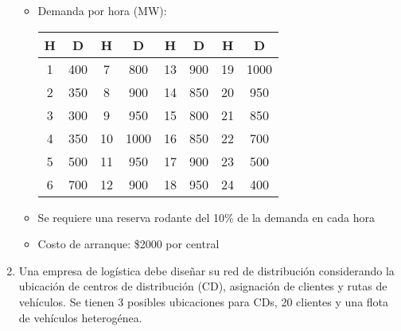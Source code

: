\documentclass[12pt]{article}
\begin{document}
\begin{enumerate}
\begin{itemize}
\item Demanda por hora (MW):

\begin{center}
\begin{tabular}{cccccccc}
\toprule
H & D & H & D & H & D & H & D \\
\midrule
1 & 400 & 7 & 800 & 13 & 900 & 19 & 1000 \\
2 & 350 & 8 & 900 & 14 & 850 & 20 & 950 \\
3 & 300 & 9 & 950 & 15 & 800 & 21 & 850 \\
4 & 350 & 10 & 1000 & 16 & 850 & 22 & 700 \\
5 & 500 & 11 & 950 & 17 & 900 & 23 & 500 \\
6 & 700 & 12 & 900 & 18 & 950 & 24 & 400 \\
\bottomrule
\end{tabular}
\end{center}

\item Se requiere una reserva rodante del 10\% de la demanda en cada hora
\item Costo de arranque: \$2000 por central
\end{itemize}

\item Una empresa de logística debe diseñar su red de distribución considerando la ubicación de centros de distribución (CD), asignación de clientes y rutas de vehículos. Se tienen 3 posibles ubicaciones para CDs, 20 clientes y una flota de vehículos heterogénea.


\end{enumerate}
\end{document}
